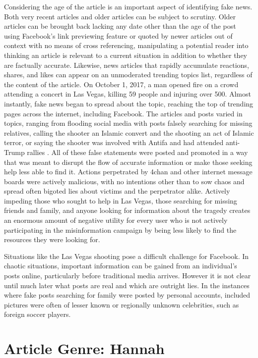 \documentclass[12pt]{article}
\begin{document}
Considering the age of the article is an important aspect of identifying fake news. Both very recent articles and older articles can be subject to scrutiny. Older articles can be brought back lacking any date other than the age of the post using Facebook's link previewing feature or quoted by newer articles out of context with no means of cross referencing, manipulating a potential reader into thinking an article is relevant to a current situation in addition to whether they are factually accurate. Likewise, news articles that rapidly accumulate reactions, shares, and likes can appear on an unmoderated trending topics list, regardless of the content of the article. On October 1, 2017, a man opened fire on a crowd attending a concert in Las Vegas, killing 59 people and injuring over 500. Almost instantly, fake news began to spread about the topic, reaching the top of trending pages across the internet, including Facebook. The articles and posts varied in topics, ranging from flooding social media with posts falsely searching for missing relatives, calling the shooter an Islamic convert and the shooting an act of Islamic terror, or saying the shooter was involved with Antifa and had attended anti-Trump rallies \citep{buzzfeed_vegas_conspiracies}. All of these false statements were posted and promoted in a way that was meant to disrupt the flow of accurate information or make those seeking help less able to find it. Actions perpetrated by 4chan and other internet message boards were actively malicious, with no intentions other than to sow chaos and spread often bigoted lies about victims and the perpetrator alike. Actively impeding those who sought to help in Las Vegas, those searching for missing friends and family, and anyone looking for information about the tragedy creates an enormous amount of negative utility for every user who is not actively participating in the misinformation campaign by being less likely to find the resources they were looking for.

Situations like the Las Vegas shooting pose a difficult challenge for Facebook. In chaotic situations, important information can be gained from an individual's posts online, particularly before traditional media arrives. However it is not clear until much later what posts are real and which are outright lies. In the instances where fake posts searching for family were posted by personal accounts, included pictures were often of lesser known or regionally unknown celebrities, such as foreign soccer players.

\section{Article Genre: Hannah}
\end{document}
